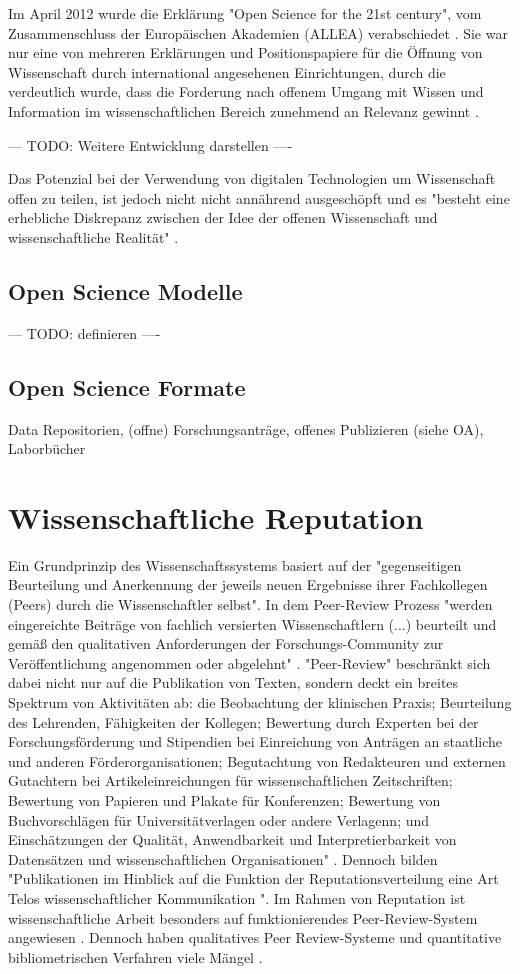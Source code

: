 Im April 2012 wurde die Erklärung "Open Science for the 21st century", vom Zusammenschluss der Europäischen Akademien (ALLEA) verabschiedet \cite{ALLEA_2012}. Sie war nur eine von mehreren Erklärungen und Positionspapiere für die Öffnung von Wissenschaft durch international angesehenen Einrichtungen, durch die verdeutlich wurde, dass die Forderung nach offenem Umgang mit Wissen und Information im wissenschaftlichen Bereich zunehmend an Relevanz gewinnt \cite{schulze_2013_open}.

--- TODO: Weitere Entwicklung darstellen ----

Das Potenzial bei der Verwendung von digitalen Technologien um Wissenschaft offen zu teilen, ist jedoch nicht nicht annährend ausgeschöpft und es "besteht eine erhebliche Diskrepanz zwischen der Idee der offenen Wissenschaft und wissenschaftliche Realität" \cite{Scheliga_2014}.

\subsection{Open Science Modelle}
--- TODO: definieren ----
\subsection{Open Science Formate}
Data Repositorien, (offne) Forschungsanträge, offenes Publizieren (siehe OA), Laborbücher

\section{Wissenschaftliche Reputation}
Ein Grundprinzip des Wissenschaftssystems basiert auf der "gegenseitigen Beurteilung und Anerkennung der jeweils neuen Ergebnisse ihrer Fachkollegen (Peers) durch die Wissenschaftler selbst"\cite{Hanekop_2014}. In dem Peer-Review Prozess "werden eingereichte Beiträge von fachlich versierten Wissenschaftlern (...) beurteilt und gemäß den qualitativen Anforderungen der Forschungs-Community zur Veröffentlichung angenommen oder abgelehnt" \cite{Hess_2006}. "Peer-Review" beschränkt sich dabei nicht nur auf die Publikation von Texten, sondern deckt ein breites Spektrum von Aktivitäten ab: die Beobachtung der klinischen Praxis; Beurteilung des Lehrenden, Fähigkeiten der Kollegen; Bewertung durch Experten bei der Forschungsförderung und Stipendien bei Einreichung von Anträgen an staatliche und anderen Förderorganisationen; Begutachtung von Redakteuren und externen Gutachtern bei Artikeleinreichungen für wissenschaftlichen Zeitschriften; Bewertung von Papieren und Plakate für Konferenzen; Bewertung von Buchvorschlägen für Universitätverlagen oder andere Verlagenn; und Einschätzungen der Qualität, Anwendbarkeit und Interpretierbarkeit von Datensätzen und wissenschaftlichen Organisationen" \cite{Lee_2012}. Dennoch bilden "Publikationen im Hinblick auf die Funktion der Reputationsverteilung eine Art Telos wissenschaftlicher Kommunikation "\cite{hirschauer2004peer}. Im Rahmen von Reputation ist wissenschaftliche Arbeit besonders auf funktionierendes Peer-Review-System angewiesen \cite{suchen}. Dennoch haben qualitatives Peer Review-Systeme und quantitative bibliometrischen Verfahren viele Mängel\cite{osterloh2008anreize} \cite{Lee_2012}.

